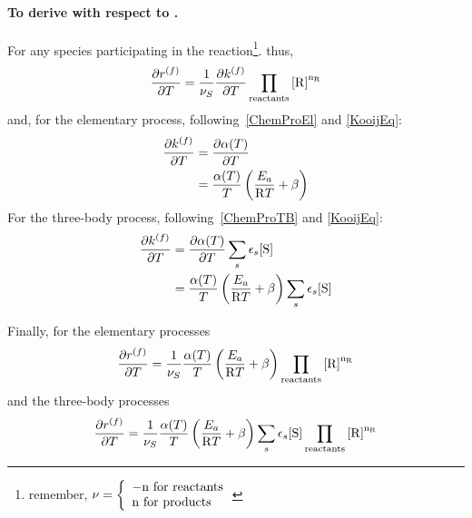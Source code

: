 \paragraph{To derive with respect to \Temp.}
For any species  participating in the reaction\footnote{remember, 
$\scoef = \left\{\begin{array}{l}-\scoefabs\text{ for reactants}\\\scoefabs\text{ for products}\end{array}\right.$}.
thus,
\begin{equation}
\doverdT{\fwdrate} = \frac{1}{\scoef[S]}
                   \doverdT{\fwdratecons}
                   \prodReac
\end{equation}
and, for the elementary process, following~\ref{ChemProEl} and \ref{KooijEq}:
\begin{equation}
\begin{split}
\doverdT{\fwdratecons} & = \doverdT{\kinMod} \\
                       & = \frac{\kinMod}{\Temp} \left(\frac{E_a}{\Rg \Temp} + \beta\right)
\end{split}
\end{equation}
For the three-body process, following~\ref{ChemProTB} and \ref{KooijEq}:
\begin{equation}
\begin{split}
\doverdT{\fwdratecons} & = \doverdT{\kinMod} \threeBody \\
                       & = \frac{\kinMod}{\Temp} \left(\frac{E_a}{\Rg \Temp} + \beta\right) \threeBody
\end{split}
\end{equation}

Finally,
for the elementary processes
\begin{equation}
\doverdT{\fwdrate} = \frac{1}{\scoef[S]} \frac{\kinMod}{\Temp} \left(\frac{E_a}{\Rg \Temp} + \beta\right)
                                                \prodReac
\label{derivTEP}
\end{equation}
and the three-body processes
\begin{equation}
\doverdT{\fwdrate} = \frac{1}{\scoef[S]} \frac{\kinMod}{\Temp} \left(\frac{E_a}{\Rg \Temp} + \beta\right) \threeBody
                                                \prodReac
\label{derivTTB}
\end{equation}

